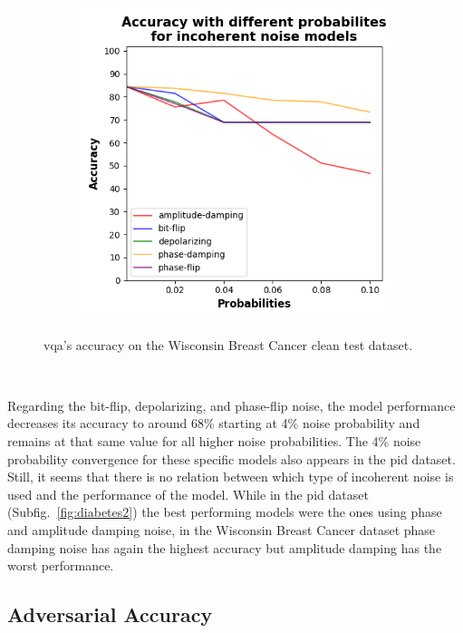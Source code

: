 \begin{figure}[!h]
\begin{subfigure}{0.45\textwidth}
      \includegraphics[width=\linewidth]{figures/evaluation_results/breast-cancer/pqc/figures/accuracy-incoherent.png}
      \label{fig:bc2}
  \end{subfigure}

  \caption{\ac{vqa}'s accuracy on the Wisconsin Breast Cancer clean test dataset.}
  \label{fig:bc-12}
\end{figure} \

Regarding the bit-flip, depolarizing, and phase-flip noise, the model
performance decreases its accuracy to around 68\% starting at
4\% noise probability and remains at that same value for all
higher noise probabilities. The 4\% noise probability convergence
for these specific models also appears in the \ac{pid} dataset. Still,
it seems that there is no relation between which type of incoherent noise
is used and the performance of the model. While in the \ac{pid}
dataset (Subfig.~\ref{fig:diabetes2}) the best performing models
were the ones using phase and amplitude damping noise, in the
Wisconsin Breast Cancer dataset phase damping noise has again the
highest accuracy but amplitude damping has the worst performance. \

\subsection{Adversarial Accuracy}\label{subsection:breast-cancer-adv-acc} \

